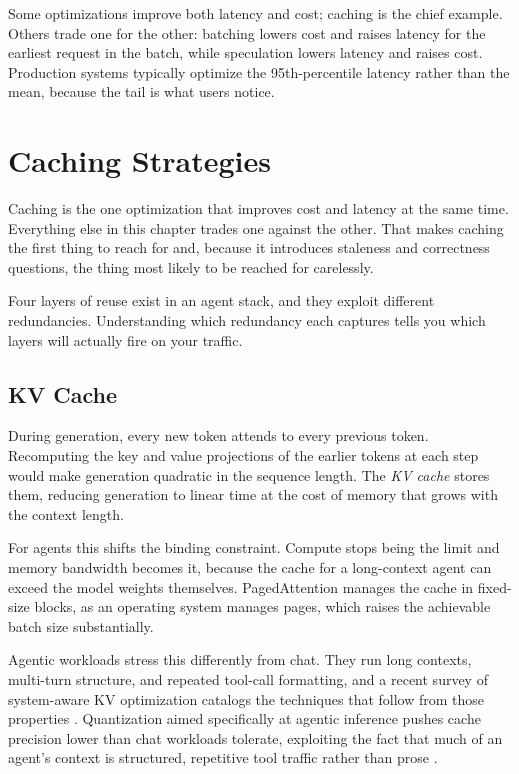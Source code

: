 \documentclass[11pt]{book}
\begin{document}
Some optimizations improve both latency and cost; caching is the chief example. Others trade one for the other: batching lowers cost and raises latency for the earliest request in the batch, while speculation lowers latency and raises cost. Production systems typically optimize the 95th-percentile latency rather than the mean, because the tail is what users notice.

\section{Caching Strategies}

Caching is the one optimization that improves cost and latency at the same time. Everything else in this chapter trades one against the other. That makes caching the first thing to reach for and, because it introduces staleness and correctness questions, the thing most likely to be reached for carelessly.

Four layers of reuse exist in an agent stack, and they exploit different redundancies. Understanding which redundancy each captures tells you which layers will actually fire on your traffic.

\subsection{KV Cache}

During generation, every new token attends to every previous token. Recomputing the key and value projections of the earlier tokens at each step would make generation quadratic in the sequence length. The \emph{KV cache} stores them, reducing generation to linear time at the cost of memory that grows with the context length.

For agents this shifts the binding constraint. Compute stops being the limit and memory bandwidth becomes it, because the cache for a long-context agent can exceed the model weights themselves. PagedAttention \cite{vllm2023} manages the cache in fixed-size blocks, as an operating system manages pages, which raises the achievable batch size substantially.

Agentic workloads stress this differently from chat. They run long contexts, multi-turn structure, and repeated tool-call formatting, and a recent survey of system-aware KV optimization catalogs the techniques that follow from those properties \cite{kvsurvey2026}. Quantization aimed specifically at agentic inference pushes cache precision lower than chat workloads tolerate, exploiting the fact that much of an agent's context is structured, repetitive tool traffic rather than prose \cite{triaxialkv2026}.
\end{document}
